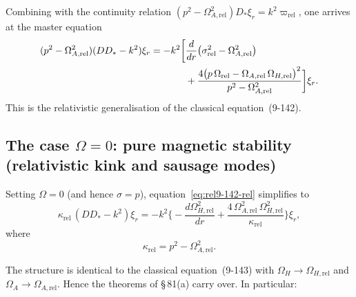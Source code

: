 Combining with the continuity relation $(p^{2} -
\Omega_{A,\mathrm{rel}}^{2})D_{*}\xi_r = k^{2}\varpi_{\mathrm{rel}}$,
one arrives at the master equation
\begin{align}
  (p^{2} - \Omega_{A,\mathrm{rel}}^{2})(DD_{*} - k^{2})\xi_r
  = -k^{2}\biggl[
    &\frac{d}{dr}\bigl(\sigma_{\mathrm{rel}}^{2}
      - \Omega_{A,\mathrm{rel}}^{2}\bigr) \notag\\
    &+ \frac{4\bigl(p\,\Omega_{\mathrm{rel}}
        - \Omega_{A,\mathrm{rel}}\,\Omega_{H,\mathrm{rel}}
      \bigr)^{2}}{p^{2} - \Omega_{A,\mathrm{rel}}^{2}}
  \biggr]\xi_r.
  \label{eq:rel9-142-rel}
\end{align}
This is the relativistic generalisation of the classical
equation~(9-142).

\subsection{The case $\Omega = 0$: pure magnetic stability
  (relativistic kink and sausage modes)}
\label{sec:rel9-85-Omega0}

Setting $\Omega = 0$ (and hence $\sigma = p$),
equation~\eqref{eq:rel9-142-rel} simplifies to
\begin{equation}
  \kappa_{\mathrm{rel}}\,(DD_{*} - k^{2})\xi_r
  = -k^{2}\biggl\{
    -\frac{d\Omega_{H,\mathrm{rel}}^{2}}{dr}
    + \frac{4\,\Omega_{A,\mathrm{rel}}^{2}\,
            \Omega_{H,\mathrm{rel}}^{2}}
           {\kappa_{\mathrm{rel}}}
  \biggr\}\xi_r,
  \label{eq:rel9-143-rel}
\end{equation}
where
\begin{equation}
  \kappa_{\mathrm{rel}}
  = p^{2} - \Omega_{A,\mathrm{rel}}^{2}.
  \label{eq:rel9-kappa-rel}
\end{equation}

The structure is identical to the classical equation~(9-143) with
$\Omega_H \to \Omega_{H,\mathrm{rel}}$ and
$\Omega_A \to \Omega_{A,\mathrm{rel}}$.  Hence the theorems of
\S\,81(a) carry over.  In particular:

